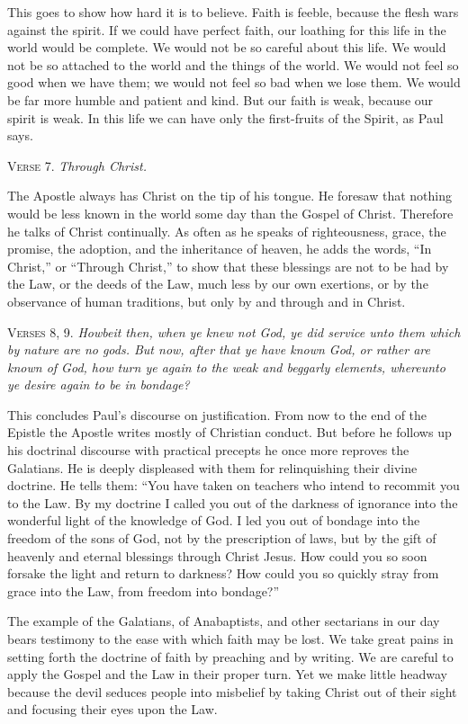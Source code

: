 This goes to show how hard it is to believe. Faith is feeble, because the flesh wars against the spirit. If we could have perfect faith, our loathing for this life in the world would be complete. We would not be so careful about this life. We would not be so attached to the world and the things of the world. We would not feel so good when we have them; we would not feel so bad when we lose them. We would be far more humble and patient and kind. But our faith is weak, because our spirit is weak. In this life we can have only the first-fruits of the Spirit, as Paul says.

\textsc{Verse} 7. \emph{Through Christ.}

The Apostle always has Christ on the tip of his tongue. He foresaw that nothing would be less known in the world some day than the Gospel of Christ. Therefore he talks of Christ continually. As often as he speaks of righteousness, grace, the promise, the adoption, and the inheritance of heaven, he adds the words, “In Christ,” or “Through Christ,” to show that these blessings are not to be had by the Law, or the deeds of the Law, much less by our own exertions, or by the observance of human traditions, but only by and through and in Christ.

\textsc{Verses} 8, 9. \emph{Howbeit then, when ye knew not God, ye did service unto them which by nature are no gods. But now, after that ye have known God, or rather are known of God, how turn ye again to the weak and beggarly elements, whereunto ye desire again to be in bondage?}

This concludes Paul’s discourse on justification. From now to the end of the Epistle the Apostle writes mostly of Christian conduct. But before he follows up his doctrinal discourse with practical precepts he once more reproves the Galatians. He is deeply displeased with them for relinquishing their divine doctrine. He tells them: “You have taken on teachers who intend to recommit you to the Law. By my doctrine I called you out of the darkness of ignorance into the wonderful light of the knowledge of God. I led you out of bondage into the freedom of the sons of God, not by the prescription of laws, but by the gift of heavenly and eternal blessings through Christ Jesus. How could you so soon forsake the light and return to darkness? How could you so quickly stray from grace into the Law, from freedom into bondage?”

The example of the Galatians, of Anabaptists, and other sectarians in our day bears testimony to the ease with which faith may be lost. We take great pains in setting forth the doctrine of faith by preaching and by writing. We are careful to apply the Gospel and the Law in their proper turn. Yet we make little headway because the devil seduces people into misbelief by taking Christ out of their sight and focusing their eyes upon the Law.

